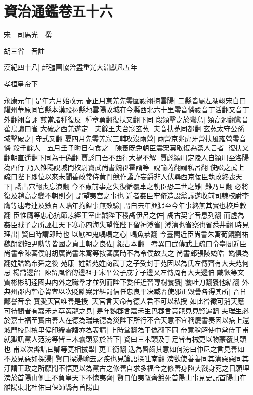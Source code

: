 \chapter{資治通鑑卷五十六}
宋　司馬光　撰

胡三省　音註

漢紀四十八|{
	起彊圉協洽盡重光大淵獻凡五年}


孝桓皇帝下

永康元年|{
	是年六月始改元}
春正月東羌先零圍祋祤掠雲陽|{
	二縣皆屬左馮翊宋白曰耀州華原同官縣本漢祋祤縣地雲陽故城在今縣西北六十里零音憐祋音丁活翻又音丁外翻祤音詡}
煎當諸種復反|{
	種章勇翻復扶又翻下同}
段熲擊之於鸞鳥|{
	熲高迥翻鸞音雚鳥讀曰雀}
大破之西羌遂定　夫餘王夫台寇玄菟|{
	夫音扶莬同都翻}
玄菟太守公孫域擊破之|{
	守式又翻}
夏四月先零羌寇三輔攻沒兩營|{
	兩營京兆虎牙營扶風雍營零音憐}
殺千餘人　五月壬子晦日有食之　陳蕃既免朝臣震栗莫敢復為黨人言者|{
	復扶又翻朝直遥翻下同為于偽翻}
賈彪曰吾不西行大禍不解|{
	賈彪潁川定陵人自潁川至洛陽為西行}
乃入雒陽說城門校尉竇武尚書魏郡霍諝等|{
	說輸芮翻諝私呂翻}
使訟之武上疏曰陛下即位以來未聞善政常侍黄門競作譎詐妄爵非人伏尋西京佞臣執政終喪天下|{
	譎古穴翻喪息浪翻}
今不慮前事之失復循覆車之軌臣恐二世之難|{
	難乃旦翻}
必將復及趙高之變不朝則夕|{
	謂望夷宫之事也}
近者姦臣牢脩造設黨議遂收前司隷校尉李膺等逮考連及數百人曠年拘録事無效驗|{
	謂自去年興獄至今年事終無其實也校戶教翻}
臣惟膺等忠心抗節志經王室此誠陛下稷卨伊呂之佐|{
	卨古契字音息列翻}
而虚為姦臣賊子之所誣枉天下寒心四海失望惟陛下留神澄省|{
	澄清也省察也省悉井翻}
時見理出|{
	賢曰時謂即時也}
以厭神鬼喁喁之心|{
	喁魚恭翻}
今臺閣近臣尚書朱㝢荀鯤劉祐魏朗劉矩尹勲等皆國之貞士朝之良佐|{
	緄古本翻　考異曰武傳武上疏曰令臺閻近臣尚書令陳蕃僕射胡廣尚書朱㝢等按蕃廣時不為令僕故去之}
尚書郎張陵媯皓|{
	媯俱為翻姓譜媯帝舜之後}
苑康|{
	姓譜苑姓商武丁之子受封于苑因以為氏左傳齊有大夫苑何忌}
楊喬邊韶|{
	陳留風俗傳邊祖于宋平公子戍字子邊又左傳周有大夫邊伯}
戴恢等文質彬彬明逹國典内外之職羣才並列而陛下委任近習專樹饕餮|{
	饕吐刀翻餮他結翻}
外典州郡内幹心膂宜以次貶黜案罪糾罰信任忠良平决臧否使邪正毁譽各得其所|{
	否音鄙譽音余}
寶愛天官唯善是授|{
	天官言天命有德人君不可以私授}
如此咎徵可消天應可待間者有嘉禾芝草黄龍之見|{
	是年魏郡言嘉禾生巴郡言黄龍見見賢遍翻}
夫瑞生必於嘉士福至實由善人在德為瑞無德為災陛下所行不合天意不宜稱慶書奏因以病上還城門校尉槐里侯印綬霍諝亦為表請|{
	上時掌翻為于偽翻下同}
帝意稍解使中常侍王甫就獄訊黨人范滂等皆三木囊頭暴於階下|{
	賢曰三木頭及手足皆有械更以物蒙覆其頭也}
甫以次辯詰曰卿等更相拔舉|{
	更工衡翻}
迭為唇齒其意如何滂曰仲尼之言見善如不及見惡如探湯|{
	賢曰探湯喻去之疾也見論語探吐南翻}
滂欲使善善同其清惡惡同其汙謂王政之所願聞不悟更以為黨古之修善自求多福今之修善身陷大戮身死之日願埋滂於首陽山側上不負皇天下不愧夷齊|{
	賢曰伯夷叔齊餓死首陽山事見史記首陽山在雒陽東北杜佑曰偃師縣有首陽山}
